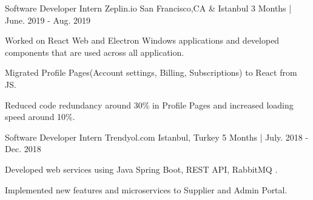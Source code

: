 
\begin{cventries}

  \cventry
   {Software Developer Intern} %
    {Zeplin.io} %
    {San Francisco,CA \& Istanbul} %
    {3 Months | June. 2019 - Aug. 2019} %
    {
      \begin{cvitems} %
        \item {Worked on React Web and Electron Windows applications and developed components that are used across all application.}
		\item {Migrated Profile Pages(Account settings, Billing, Subscriptions) to React from JS.}
        \item {Reduced code redundancy around 30\% in Profile Pages and increased loading speed around 10\%. }
      \end{cvitems}
    }

\vspace{-2mm}
  \cventry
   {Software Developer Intern} %
    {Trendyol.com} %
    {Istanbul, Turkey} %
    {5 Months | July. 2018 - Dec. 2018} %
    {
      \begin{cvitems} %
		    \item {Developed web services using Java Spring Boot, REST API, RabbitMQ .}
        \item {Implemented new features and microservices to Supplier and Admin Portal.}
      \end{cvitems}
    }


\end{cventries}
